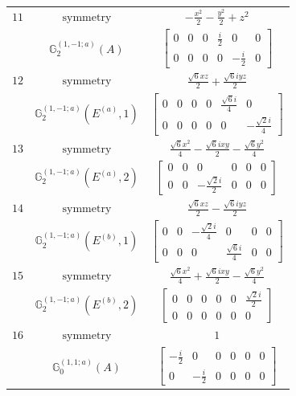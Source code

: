 \documentclass[fleqn,8pt,landscape]{jsarticle}
\begin{document}
\begin{longtable}{ccc}
$ 11 $ & $ \text{symmetry} $ & $ - \frac{x^{2}}{2} - \frac{y^{2}}{2} + z^{2} $ \\
$  $ & $ \mathbb{G}_{2}^{(1,-1;a)}(A) $ & $ \begin{bmatrix} 0 & 0 & 0 & \frac{i}{2} & 0 & 0 \\ 0 & 0 & 0 & 0 & - \frac{i}{2} & 0 \end{bmatrix} $ \\ \hline
$ 12 $ & $ \text{symmetry} $ & $ \frac{\sqrt{6} x z}{2} + \frac{\sqrt{6} i y z}{2} $ \\
$  $ & $ \mathbb{G}_{2}^{(1,-1;a)}(E^{(a)},1) $ & $ \begin{bmatrix} 0 & 0 & 0 & 0 & \frac{\sqrt{6} i}{4} & 0 \\ 0 & 0 & 0 & 0 & 0 & - \frac{\sqrt{2} i}{4} \end{bmatrix} $ \\ \hline
$ 13 $ & $ \text{symmetry} $ & $ \frac{\sqrt{6} x^{2}}{4} - \frac{\sqrt{6} i x y}{2} - \frac{\sqrt{6} y^{2}}{4} $ \\
$  $ & $ \mathbb{G}_{2}^{(1,-1;a)}(E^{(a)},2) $ & $ \begin{bmatrix} 0 & 0 & 0 & 0 & 0 & 0 \\ 0 & 0 & - \frac{\sqrt{2} i}{2} & 0 & 0 & 0 \end{bmatrix} $ \\ \hline
$ 14 $ & $ \text{symmetry} $ & $ \frac{\sqrt{6} x z}{2} - \frac{\sqrt{6} i y z}{2} $ \\
$  $ & $ \mathbb{G}_{2}^{(1,-1;a)}(E^{(b)},1) $ & $ \begin{bmatrix} 0 & 0 & - \frac{\sqrt{2} i}{4} & 0 & 0 & 0 \\ 0 & 0 & 0 & \frac{\sqrt{6} i}{4} & 0 & 0 \end{bmatrix} $ \\ \hline
$ 15 $ & $ \text{symmetry} $ & $ \frac{\sqrt{6} x^{2}}{4} + \frac{\sqrt{6} i x y}{2} - \frac{\sqrt{6} y^{2}}{4} $ \\
$  $ & $ \mathbb{G}_{2}^{(1,-1;a)}(E^{(b)},2) $ & $ \begin{bmatrix} 0 & 0 & 0 & 0 & 0 & \frac{\sqrt{2} i}{2} \\ 0 & 0 & 0 & 0 & 0 & 0 \end{bmatrix} $ \\ \hline
$ 16 $ & $ \text{symmetry} $ & $ 1 $ \\
$  $ & $ \mathbb{G}_{0}^{(1,1;a)}(A) $ & $ \begin{bmatrix} - \frac{i}{2} & 0 & 0 & 0 & 0 & 0 \\ 0 & - \frac{i}{2} & 0 & 0 & 0 & 0 \end{bmatrix} $ \\ \hline

\end{longtable}
\end{document}
